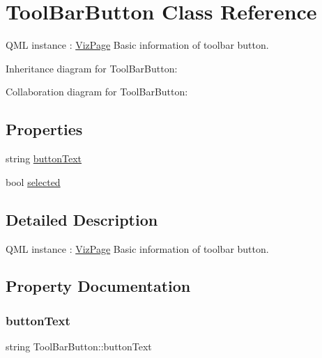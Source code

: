\hypertarget{class_tool_bar_button}{}\section{Tool\+Bar\+Button Class Reference}
\label{class_tool_bar_button}


Q\+ML instance \+: \hyperlink{class_viz_page}{Viz\+Page} Basic information of toolbar button.  




Inheritance diagram for Tool\+Bar\+Button\+:


Collaboration diagram for Tool\+Bar\+Button\+:
\subsection*{Properties}
\begin{DoxyCompactItemize}
\item 
string \hyperlink{class_tool_bar_button_a3d59d34964733c7748a9a7e40073e346}{button\+Text}
\item 
bool \hyperlink{class_tool_bar_button_a4031c8e03369a4ba37bda2951db0c582}{selected}
\end{DoxyCompactItemize}


\subsection{Detailed Description}
Q\+ML instance \+: \hyperlink{class_viz_page}{Viz\+Page} Basic information of toolbar button. 

\subsection{Property Documentation}
\mbox{\label{class_tool_bar_button_a3d59d34964733c7748a9a7e40073e346}} 
\subsubsection{\texorpdfstring{button\+Text}{buttonText}}
{\footnotesize\ttfamily string Tool\+Bar\+Button\+::button\+Text}

\mbox{\label{class_tool_bar_button_a4031c8e03369a4ba37bda2951db0c582}} 

